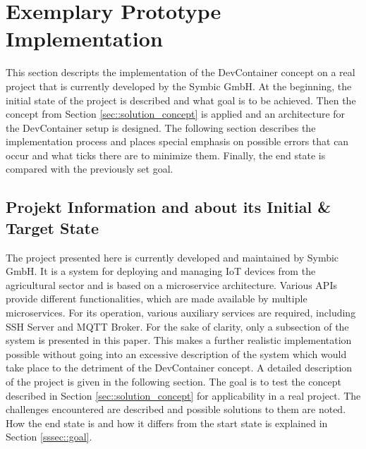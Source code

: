 \documentclass[12pt, a4paper]{article}
\begin{document}
\section{Exemplary Prototype Implementation}\label{sec::solution_code}
This section descripts the implementation of the DevContainer concept on a real project that is currently developed by the Symbic GmbH. At the beginning, the initial state of the project is described and what goal is to be achieved. Then the concept from Section \ref{sec::solution_concept} is applied and an architecture for the DevContainer setup is designed. The following section describes the implementation process and places special emphasis on possible errors that can occur and what ticks there are to minimize them. Finally, the end state is compared with the previously set goal.

    \subsection{Projekt Information and about its Initial \& Target State}
    The project presented here is currently developed and maintained by Symbic GmbH. It is a system for deploying and managing \ac{IoT} devices from the agricultural sector and is based on a microservice architecture. Various \ac{API}s provide different functionalities, which are made available by multiple microservices. For its operation, various auxiliary services are required, including SSH Server and MQTT Broker. For the sake of clarity, only a subsection of the system is presented in this paper. This makes a further realistic implementation possible without going into an excessive description of the system which would take place to the detriment of the DevContainer concept. A detailed description of the project is given in the following section. \newline
    The goal is to test the concept described in Section \ref{sec::solution_concept} for applicability in a real project. The challenges encountered are described and possible solutions to them are noted. How the end state is and how it differs from the start state is explained in Section \ref{sssec::goal}.
\end{document}
